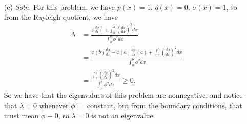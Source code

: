 \documentclass{article}
\begin{document}
\begin{itemize}
\begin{itemize}
        \item[(e)] \textit{Soln.} For this problem, we have $p(x) = 1$, $q(x) = 0$, $\sigma(x) = 1$, so from the Rayleigh quotient, we have
        \begin{align*}
            \lambda &= \frac{\phi\frac{d\phi}{dx}\big|_a^b + \int_a^b\left(\frac{d\phi}{dx}\right)^2dx}{\int_a^b\phi^2dx}\\
            &= \frac{\phi(b)\frac{d\phi}{dx} - \phi(a)\frac{d\phi}{dx}(a) + \int_a^b\left(\frac{d\phi}{dx}\right)^2dx}{\int_a^b\phi^2dx}\\
            &= \frac{\int_a^b \left(\frac{d\phi}{dx}\right)^2dx}{\int_a^b \phi^2dx} \geq 0. \tag{B.C.s}
        \end{align*}
        So we have that the eigenvalues of this problem are nonnegative, and notice that $\lambda = 0$ whenever $\phi = $ constant, but from the boundary conditions, that must mean $\phi \equiv 0$, so $\lambda = 0$ is not an eigenvalue.
    \end{itemize}


\end{itemize}
\end{document}
